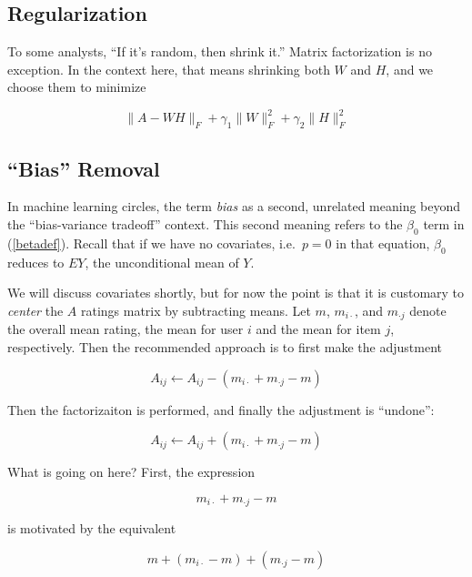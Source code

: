 \subsection{Regularization}

To some analysts, ``If it's random, then shrink it.''  Matrix
factorization is no exception.  In the context here, that means
shrinking both $W$ and $H$, and we choose them to minimize

\begin{equation}
\|A - WH\|_F + \gamma_1 \|W\|_F^2 + \gamma_2 \|H\|_F^2
\end{equation}

\subsection{``Bias'' Removal}

In machine learning circles, the term \textit{bias} as a second,
unrelated meaning beyond the ``bias-variance tradeoff'' context.
This second meaning refers to the $\beta_0$ term in (\ref{betadef}).
Recall that if we have no covariates, i.e.\ $p = 0$ in that equation,
$\beta_0$ reduces to $EY$, the unconditional mean of $Y$.  

We will discuss covariates shortly, but for now the point is that it is
customary to \textit{center} the $A$ ratings matrix by subtracting
means.  Let $m$, $m_{i \cdot}$, and $m_{\cdot j}$ denote the overall
mean rating, the mean for user $i$ and the mean for item $j$,
respectively.  Then the recommended approach is to first make the
adjustment

\begin{equation}
\label{adjust}
A_{ij} \leftarrow A_{ij} - (m_{i \cdot} + m_{\cdot j} -m)
\end{equation}

Then the factorizaiton is performed, and finally the adjustment is
``undone'':

\begin{equation}
\label{unadjust}
A_{ij} \leftarrow A_{ij} + (m_{i \cdot} + m_{\cdot j} -m)
\end{equation}

What is going on here?  First, the expression

\begin{equation}
m_{i \cdot} + m_{\cdot j} -m
\end{equation}

is motivated by the equivalent

\begin{equation}
\label{anova}
m + (m_{i \cdot} - m) + (m_{\cdot j} -m)
\end{equation}


